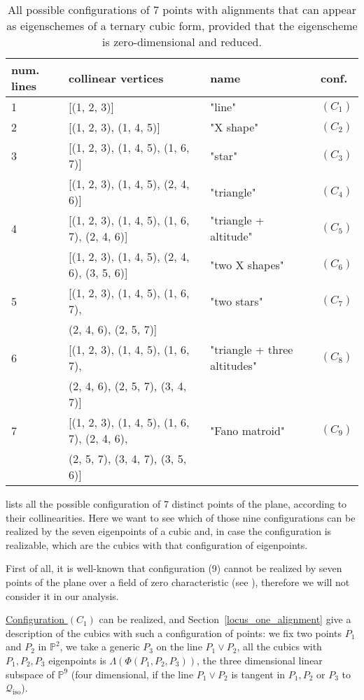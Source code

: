 \documentclass{amsart}
\theoremstyle{plain}
\theoremstyle{definition}
\newcommand{\iso}{\mathcal{Q}_{\mathrm{iso}}}
\begin{document}
\begin{table}
\caption{All possible configurations of $7$ points with alignments that can appear as eigenschemes of a ternary cubic form, provided that the eigenscheme is zero-dimensional and reduced.}
\centering
\begin{tabular}{|llll|}\hline
  num. lines  & collinear vertices & name & conf.\\ \hline
 1& [(1, 2, 3)] & "line" & $(C_1)$\\
 2& [(1, 2, 3), (1, 4, 5)] & "X shape"& $(C_2)$\\
 3& [(1, 2, 3), (1, 4, 5), (1, 6, 7)] & "star" & $(C_3)$\\
  & [(1, 2, 3), (1, 4, 5), (2, 4, 6)] & "triangle" & $(C_4)$\\
 4& [(1, 2, 3), (1, 4, 5), (1, 6, 7), (2, 4, 6)] & "triangle + altitude"
& $(C_5)$\\
  & [(1, 2, 3), (1, 4, 5), (2, 4, 6), (3, 5, 6)] & "two X shapes" & $(C_6)$\\
 5& [(1, 2, 3), (1, 4, 5), (1, 6, 7),  & "two stars" & $(C_7)$\\
  & \phantom{[}(2, 4, 6), (2, 5, 7)] & &\\
 6& [(1, 2, 3), (1, 4, 5), (1, 6, 7), & "triangle + three altitudes" & $(C_8)$\\
  & \phantom{[} (2, 4, 6), (2, 5, 7), (3, 4, 7)] & & \\
 7& [(1, 2, 3),
   (1, 4, 5),
   (1, 6, 7),
   (2, 4, 6), & "Fano matroid" & $(C_9)$\\
  & \phantom{[} (2, 5, 7),
   (3, 4, 7),
   (3, 5, 6)] & & \\ \hline
\end{tabular}
\label{table:all_alignments}
\end{table}

 lists all the possible configuration
of 7 distinct points of the plane, according to their collinearities. Here
we want to see which of those nine configurations can be realized by
the seven eigenpoints of a cubic and, in case the configuration is
realizable, which are the cubics with that configuration of eigenpoints.

First of all, it is well-known that configuration (9) cannot be realized
by seven points of the plane over a field of zero
characteristic (see \cite{Whitney1935}), therefore we will not consider
it in our analysis.

\underline{Configuration $(C_1)$} can be realized,
 and Section~\ref{locus_one_alignment}
give a description of the cubics with such a configuration of points:
we fix two points $P_1$ and $P_2$ in $\mathbb{P}^2$, we take a generic $P_3$
on the line $P_1\vee P_2$, all the cubics with
$P_1, P_2, P_3$ eigenpoints is $\Lambda(\Phi(P_1, P_2, P_3))$, the three
dimensional linear subspace of $\mathbb{P}^9$ (four dimensional, if the
line $P_1\vee P_2$ is tangent in $P_1, P_2$ or $P_3$ to $\iso$).
\end{document}

